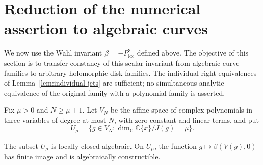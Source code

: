 \section{Reduction of the numerical assertion to algebraic curves}
\label{sec:algebraic-reduction}

We now use the Wahl invariant $\beta=-P_{\mathrm{loc}}^2$ defined above.
The objective of this section is to transfer constancy of this scalar
invariant from algebraic curve families to arbitrary holomorphic disk
families.  The individual right-equivalences of
Lemma~\ref{lem:individual-jets} are sufficient; no simultaneous analytic
equivalence of the original family with a polynomial family is asserted.

Fix $\mu>0$ and $N\geq\mu+1$.  Let $V_N$ be the affine space of complex
polynomials in three variables of degree at most $N$, with zero constant
and linear terms, and put
\[
 U_\mu=\{g\in V_N:\dim_{\mathbb C}\mathbb C\{x\}/J(g)=\mu\}.
\]

\begin{lemma}
\label{lem:mu-jet-locus}
The subset $U_\mu$ is locally closed algebraic.  On $U_\mu$, the function
$g\mapsto\beta(V(g),0)$ has finite image and is algebraically
constructible.
\end{lemma}


